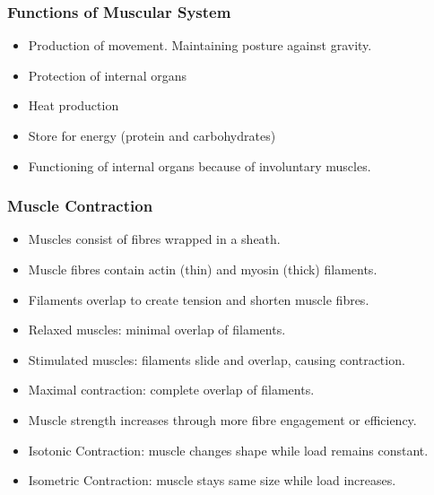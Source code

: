 \begin{frame}[fragile]\frametitle{Functions of Muscular System }

      \begin{itemize}
		\item Production of movement. Maintaining posture against gravity.
		\item Protection of internal organs
		\item Heat production
		\item Store for energy (protein and carbohydrates)
		\item Functioning of internal organs because of involuntary muscles.
	  \end{itemize}

\end{frame}

\begin{frame}[fragile]\frametitle{Muscle Contraction}

      \begin{itemize}
		\item Muscles consist of fibres wrapped in a sheath.
		\item Muscle fibres contain actin (thin) and myosin (thick) filaments.
		\item Filaments overlap to create tension and shorten muscle fibres.
		\item Relaxed muscles: minimal overlap of filaments.
		\item Stimulated muscles: filaments slide and overlap, causing contraction.
		\item Maximal contraction: complete overlap of filaments.
		\item Muscle strength increases through more fibre engagement or efficiency.
		\item Isotonic Contraction: muscle changes shape while load remains constant.
		\item Isometric Contraction: muscle stays same size while load increases.
	  \end{itemize}

\end{frame}


